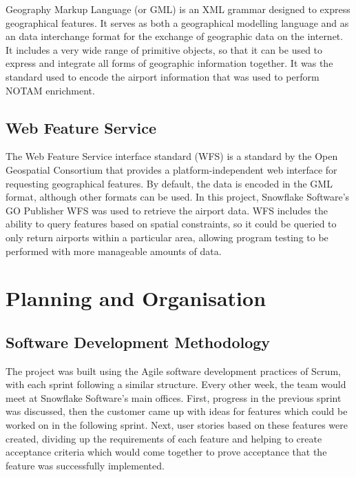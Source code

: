 \documentclass[a4paper, 12pt, twoside]{article}
\begin{document}
Geography Markup Language (or GML) is an XML grammar designed to express geographical features. It serves as both a geographical modelling language and as an data interchange format for the exchange of geographic data on the internet. It includes a very wide range of primitive objects, so that it can be used to express and integrate all forms of geographic information together. It was the standard used to encode the airport information that was used to perform NOTAM enrichment.

\subsection{Web Feature Service}
\label{sec:bg_wfs}

The Web Feature Service interface standard (WFS) is a standard by the Open Geospatial Consortium that provides a platform-independent web interface for requesting geographical features. By default, the data is encoded in the GML format, although other formats can be used. In this project, Snowflake Software's GO Publisher WFS was used to retrieve the airport data. WFS includes the ability to query features based on spatial constraints, so it could be queried to only return airports within a particular area, allowing program testing to be performed with more manageable amounts of data.

\newpage

\section{Planning and Organisation}
\label{sec:planning}

\subsection{Software Development Methodology}
\label{sec:plan_software_development_methodology}

The project was built using the Agile software development practices of Scrum, with each sprint following a similar structure. Every other week, the team would meet at Snowflake Software's main offices. First, progress in the previous sprint was discussed, then the customer came up with ideas for features which could be worked on in the following sprint. Next, user stories based on these features were created, dividing up the requirements of each feature and helping to create acceptance criteria which would come together to prove acceptance that the feature was successfully implemented.
\end{document}
